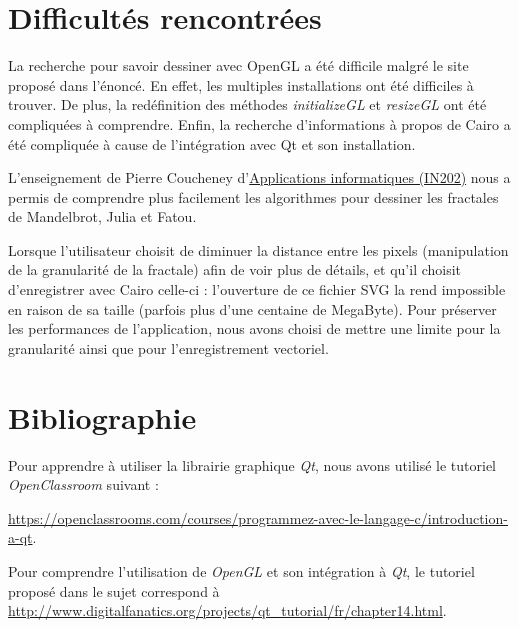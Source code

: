 \documentclass[a4]{article}
\begin{document}
\section{Difficultés rencontrées}

La recherche pour savoir dessiner avec OpenGL a été difficile malgré le site proposé dans l'énoncé.
En effet, les multiples installations ont été difficiles à trouver. De plus, la redéfinition des méthodes \emph{initializeGL} et \emph{resizeGL} ont été compliquées à comprendre. 
Enfin, la recherche d'informations à propos de Cairo a été compliquée à cause de l'intégration avec Qt et son installation. 

\vspace{1\baselineskip}
 
L'enseignement de Pierre Coucheney d'\href{http://www.uvsq.fr/licence-informatique-8283.kjsp?RH=FORM2}{Applications informatiques (IN202)} nous a permis de comprendre plus facilement les algorithmes 
pour dessiner les fractales de Mandelbrot, Julia et Fatou. 

\vspace{1\baselineskip}

Lorsque l'utilisateur choisit de diminuer la distance entre les pixels (manipulation de la granularité de la fractale) afin de voir plus de détails, et qu'il choisit d'enregistrer avec Cairo celle-ci : 
l'ouverture de ce fichier SVG la rend impossible en raison de sa taille (parfois plus d'une centaine de MegaByte). 
Pour préserver les performances de l'application, nous avons choisi de mettre une limite pour la granularité ainsi que pour l'enregistrement vectoriel. 

\vspace{1\baselineskip}

\section{Bibliographie}

Pour apprendre à utiliser la librairie graphique \emph{Qt}, nous avons utilisé le tutoriel \emph{OpenClassroom} suivant : 
\vspace{0\baselineskip}  

\url{https://openclassrooms.com/courses/programmez-avec-le-langage-c/introduction-a-qt}.
\vspace{1\baselineskip}

Pour comprendre l'utilisation de \emph{OpenGL} et son intégration à \emph{Qt}, le tutoriel proposé dans le sujet correspond à \url{http://www.digitalfanatics.org/projects/qt_tutorial/fr/chapter14.html}.
\vspace{1\baselineskip}
\end{document}
